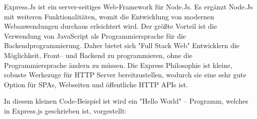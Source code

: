 Express.Js ist ein server-seitiges Web-Framework für Node.Js. Es ergänzt Node.Js mit weiteren Funktionalitäten, womit die Entwicklung von modernen Webanwendungen durchaus erleichtert wird. Der größte Vorteil ist die Verwendung von JavaScript als Programmiersprache für die Backendprogrammierung. Daher bietet sich "Full Stack Web" Entwicklern die Möglichkeit, Front– und Backend zu programmieren, ohne die Programmiersprache ändern zu müssen. 
Die Express Philosophie ist kleine, robuste Werkezuge für HTTP Server bereitzustellen, wodurch sie eine sehr gute Option für SPAs, Webseiten und öffentliche HTTP APIs ist. \cite{Express}



In diesem kleinen Code-Beispiel ist wird ein "Hello World" – Programm, welches in Express.js geschrieben ist, vorgestellt:

\cite{Express}

